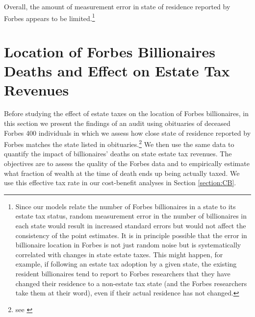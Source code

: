 \documentclass[12pt]{article}
\begin{document}
Overall,  the amount of measurement error in state of residence reported by Forbes appears to be limited.\footnote{Since our  models relate the number of Forbes billionaires in a state to its estate tax status, random measurement error in the number of billionaires in each state would result in increased standard errors but would not affect the consistency of the point estimates. It is in principle possible that the error in billionaire location in Forbes is not just random noise but is systematically correlated with changes in state estate taxes. This might happen, for example, if following an estate tax adoption by a given state, the existing resident billionaires tend to report to Forbes researchers that they have changed their residence to a non-estate tax state (and the Forbes researchers take them at their word), even if their actual residence has not changed.}






\section{Location of Forbes Billionaires Deaths and Effect on Estate Tax Revenues}
\label{section: deaths_analysis}
Before studying the effect of estate taxes on the location  of Forbes billionaires, in this section we present the findings of an audit using obituaries of deceased Forbes 400 individuals in which we assess how close state of residence reported by Forbes matches the state listed in obituaries.\footnote{see \cite{forbesdeaths}} We then use the same data to quantify the impact of billionaires' deaths on state estate tax revenues. The objectives are to assess the quality of the Forbes data and to empirically estimate what fraction of  wealth at the time of death ends up being actually taxed. We use this effective tax rate in our cost-benefit analyses in Section \ref{section:CB}.
\end{document}
